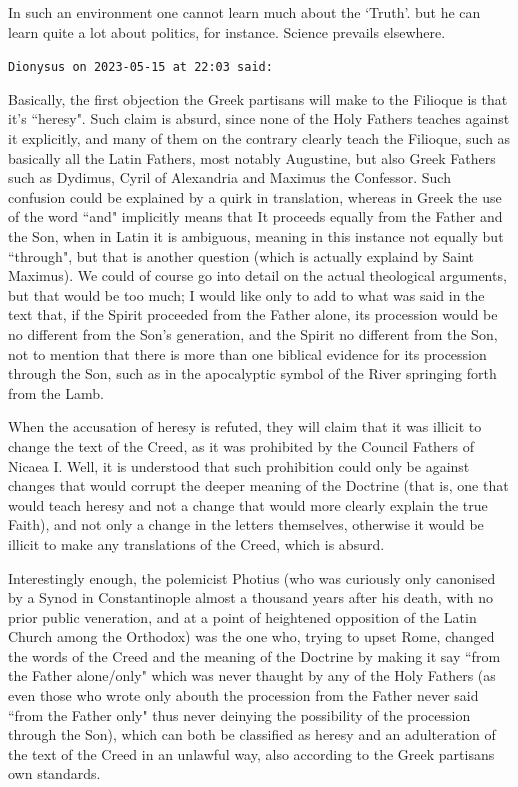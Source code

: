 \begin{footnotesize}
\begin{sffamily}
In such an environment one cannot learn much about the `Truth'. but he can learn quite a lot about politics, for instance. Science prevails elsewhere.


\hfill


\hfill

\texttt{Dionysus on 2023-05-15 at 22:03 said: }

Basically, the first objection the Greek partisans will make to the Filioque is that it's ``heresy". Such claim is absurd, since none of the Holy Fathers teaches against it explicitly, and many of them on the contrary clearly teach the Filioque, such as basically all the Latin Fathers, most notably Augustine, but also Greek Fathers such as Dydimus, Cyril of Alexandria and Maximus the Confessor. Such confusion could be explained by a quirk in translation, whereas in Greek the use of the word ``and" implicitly means that It proceeds equally from the Father and the Son, when in Latin it is ambiguous, meaning in this instance not equally but ``through", but that is another question (which is actually explaind by Saint Maximus). We could of course go into detail on the actual theological arguments, but that would be too much; I would like only to add to what was said in the text that, if the Spirit proceeded from the Father alone, its procession would be no different from the Son's generation, and the Spirit no different from the Son, not to mention that there is more than one biblical evidence for its procession through the Son, such as in the apocalyptic symbol of the River springing forth from the Lamb.

When the accusation of heresy is refuted, they will claim that it was illicit to change the text of the Creed, as it was prohibited by the Council Fathers of Nicaea I. Well, it is understood that such prohibition could only be against changes that would corrupt the deeper meaning of the Doctrine (that is, one that would teach heresy and not a change that would more clearly explain the true Faith), and not only a change in the letters themselves, otherwise it would be illicit to make any translations of the Creed, which is absurd.

Interestingly enough, the polemicist Photius (who was curiously only canonised by a Synod in Constantinople almost a thousand years after his death, with no prior public veneration, and at a point of heightened opposition of the Latin Church among the Orthodox) was the one who, trying to upset Rome, changed the words of the Creed and the meaning of the Doctrine by making it say ``from the Father alone/only" which was never thaught by any of the Holy Fathers (as even those who wrote only abouth the procession from the Father never said ``from the Father only" thus never deinying the possibility of the procession through the Son), which can both be classified as heresy and an adulteration of the text of the Creed in an unlawful way, also according to the Greek partisans own standards.


\end{sffamily}
\end{footnotesize}
